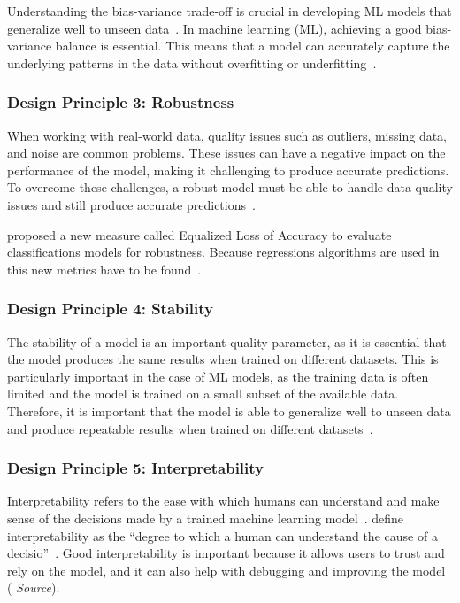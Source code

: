 Understanding the bias-variance trade-off is crucial in developing \ac{ML} models that
generalize well to unseen data~\cite[p. 49--51]{zhou_machinelearning_2021}.
In machine learning (\ac{ML}), achieving a good bias-variance balance is essential.
This means that a model can accurately capture the underlying patterns in the data
without overfitting or underfitting~\cite[p. 49--51]{zhou_machinelearning_2021}.

\subsubsection*{Design Principle 3: Robustness}

When working with real-world data, quality issues such as outliers, missing data, and
noise are common problems. These issues can have a negative impact on the performance
of the model, making it challenging to produce accurate predictions. To overcome these
challenges, a robust model must be able to handle data quality issues and still produce
accurate predictions~\cite[p. 16]{siebert2022construction}.

\cite{saez_evaluatingclassifierbehavior_2016} proposed a new measure called Equalized
Loss of Accuracy to evaluate classifications models for robustness.
Because regressions algorithms are used in this new metrics have to be found~\cite[p.
3]{saez_evaluatingclassifierbehavior_2016}.

\subsubsection*{Design Principle 4: Stability}

The stability of a model is an important quality parameter, as it is essential that
the model produces the same results when trained on different datasets.
This is particularly important in the case of \ac{ML} models, as the training data
is often limited and the model is trained on a small subset of the available data.
Therefore, it is important that the model is able to generalize well to unseen data and
produce repeatable results when trained on different datasets~\cite[p. 16]{
    siebert2022construction}.

\subsubsection*{Design Principle 5: Interpretability}

Interpretability refers to the ease with which humans can understand and make
sense of the decisions made by a trained machine learning model~\cite[p. 13]{
    molnar2020interpretable}.
\cite{miller2019explanation} define interpretability as the ``degree to which
a human can understand the cause of a decisio''~\cite[p. 1]{miller2019explanation}.
Good interpretability is important because it allows users to trust and rely
on the model, and it can also help with debugging and improving the model (\textit{
    Source}).

